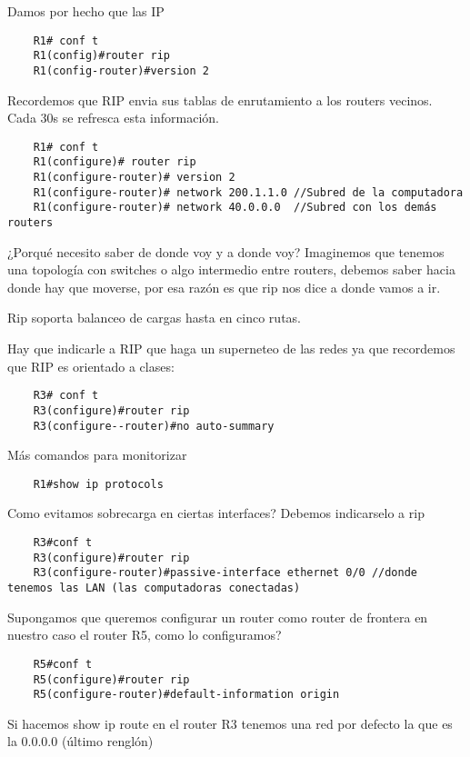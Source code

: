 Damos por hecho que las IP
\begin{lstlisting}
    R1# conf t
    R1(config)#router rip 
    R1(config-router)#version 2
\end{lstlisting}


Recordemos que RIP envia sus tablas de enrutamiento a los routers vecinos. Cada 30s se refresca esta información.   

\begin{lstlisting}
    R1# conf t
    R1(configure)# router rip 
    R1(configure-router)# version 2
    R1(configure-router)# network 200.1.1.0 //Subred de la computadora
    R1(configure-router)# network 40.0.0.0  //Subred con los demás routers
\end{lstlisting}

¿Porqué necesito saber de donde voy y a donde voy? Imaginemos que tenemos una topología con switches o algo intermedio entre routers, debemos saber hacia donde hay que moverse, por esa razón es que rip nos dice a donde vamos a ir.

Rip soporta balanceo de cargas hasta en cinco rutas.

Hay que indicarle a RIP que haga un superneteo de las redes ya que recordemos que RIP es orientado a clases:
\begin{lstlisting}
    R3# conf t
    R3(configure)#router rip
    R3(configure--router)#no auto-summary 
\end{lstlisting}

Más comandos para monitorizar 
\begin{lstlisting}
    R1#show ip protocols
\end{lstlisting}

Como evitamos sobrecarga en ciertas interfaces? Debemos indicarselo a rip 

\begin{lstlisting}
    R3#conf t
    R3(configure)#router rip 
    R3(configure-router)#passive-interface ethernet 0/0 //donde tenemos las LAN (las computadoras conectadas)
\end{lstlisting}

Supongamos que queremos configurar un router como router de frontera en nuestro caso el router R5, como lo configuramos?
\begin{lstlisting}
    R5#conf t
    R5(configure)#router rip 
    R5(configure-router)#default-information origin
\end{lstlisting}

Si hacemos show ip route en el router R3 tenemos una red por defecto la que es la 0.0.0.0 (último renglón)\\\\

